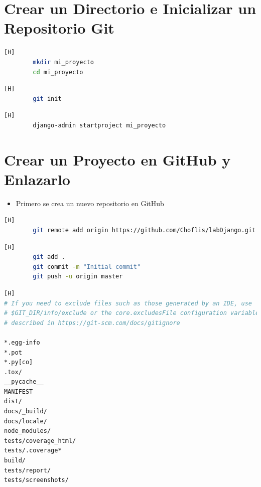 \documentclass{article}
\begin{document}
\section{Crear un Directorio e Inicializar un Repositorio Git}
	\begin{lstlisting}[language=bash,caption={Crear un directorio para el proyecto}][H]
		mkdir mi_proyecto
		cd mi_proyecto
	\end{lstlisting}
	\begin{lstlisting}[language=bash,caption={Inicializar un repositorio Git}][H]
		git init
	\end{lstlisting}
	\begin{lstlisting}[language=bash,caption={Crear un proyecto Django}][H]
		django-admin startproject mi_proyecto
	\end{lstlisting}
\section{Crear un Proyecto en GitHub y Enlazarlo}
	\begin{itemize}
		\item Primero se crea un nuevo repositorio en GitHub
	\end{itemize}  
	\begin{lstlisting}[language=bash,caption={Enlazar el repositorio local con GitHub}][H]
		git remote add origin https://github.com/Choflis/labDjango.git
	\end{lstlisting}
	\begin{lstlisting}[language=bash,caption={Agregar archivos, hacer un commit inicial y hacer push al repositorio remoto}][H]
		git add .
		git commit -m "Initial commit"
		git push -u origin master
	\end{lstlisting}
	\begin{lstlisting}[language=bash,caption={Creando un archivo .gitignore según el repositorio dado}][H]
# If you need to exclude files such as those generated by an IDE, use
# $GIT_DIR/info/exclude or the core.excludesFile configuration variable as
# described in https://git-scm.com/docs/gitignore

*.egg-info
*.pot
*.py[co]
.tox/
__pycache__
MANIFEST
dist/
docs/_build/
docs/locale/
node_modules/
tests/coverage_html/
tests/.coverage*
build/
tests/report/
tests/screenshots/
	\end{lstlisting}
\end{document}
